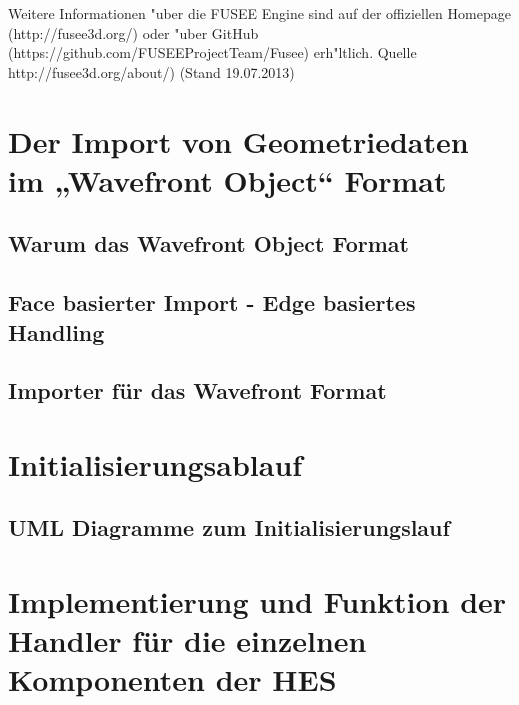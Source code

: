 \documentclass[pagesize, paper=a4, fontsize=12pt,titlepage=true, headings=small, headnosepline, abstractoff, liststotoc, nochapterprefix, plainheadsepline]{scrreprt}
\begin{document}
Weitere Informationen "uber die FUSEE Engine sind auf der offiziellen Homepage (http://fusee3d.org/) oder "uber GitHub (https://github.com/FUSEEProjectTeam/Fusee) erh"ltlich.
Quelle http://fusee3d.org/about/) (Stand 19.07.2013)

	\section {Der Import von Geometriedaten im „Wavefront Object“ Format}
		\subsection {Warum das Wavefront Object Format}
		\subsection {Face basierter Import - Edge basiertes Handling}
		\subsection {Importer für das Wavefront Format}
	\section {Initialisierungsablauf}
		\subsection {UML Diagramme zum Initialisierungslauf}
	\section {Implementierung und Funktion der Handler für die einzelnen Komponenten der HES}
\end{document}
